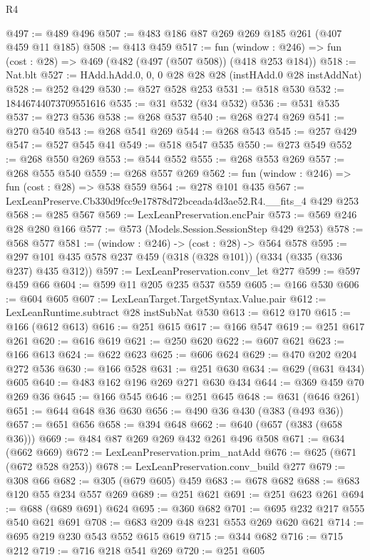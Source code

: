 \begin{lexlean}{R4}
\begin{coremodule}
@497 := @489 @496
@507 := @483 @186 @87 @269 @269 @185 @261 (@407 @459 @11 @185)
@508 := @413 @459
@517 := fun (window : @246) => fun (cost : @28) => @469 (@482 (@497 (@507 @508)) (@418 @253 @184))
@518 := Nat.blt
@527 := HAdd.hAdd.{0, 0, 0} @28 @28 @28 (instHAdd.{0} @28 instAddNat)
@528 := @252 @429
@530 := @527 @528 @253
@531 := @518 @530
@532 := 18446744073709551616
@535 := @31 @532 (@34 @532)
@536 := @531 @535
@537 := @273 @536
@538 := @268 @537
@540 := @268 @274 @269
@541 := @270 @540
@543 := @268 @541 @269
@544 := @268 @543
@545 := @257 @429
@547 := @527 @545 @41
@549 := @518 @547 @535
@550 := @273 @549
@552 := @268 @550 @269
@553 := @544 @552
@555 := @268 @553 @269
@557 := @268 @555 @540
@559 := @268 @557 @269
@562 := fun (window : @246) => fun (cost : @28) => @538 @559
@564 := @278 @101 @435
@567 := LexLeanPreserve.Cb330d9fcc9e17878d72bceada4d3ae52.R4.__fits_4 @429 @253
@568 := @285 @567
@569 := LexLeanPreservation.encPair
@573 := @569 @246 @28 @280 @166
@577 := @573 (Models.Session.SessionStep @429 @253)
@578 := @568 @577
@581 := (window : @246) -> (cost : @28) -> @564 @578
@595 := @297 @101 @435 @578 @237 @459 (@318 (@328 @101)) (@334 (@335 (@336 @237) @435 @312))
@597 := LexLeanPreservation.conv_let @277
@599 := @597 @459 @66
@604 := @599 @11 @205 @235 @537 @559
@605 := @166 @530
@606 := @604 @605
@607 := LexLeanTarget.TargetSyntax.Value.pair
@612 := LexLeanRuntime.subtract @28 instSubNat @530
@613 := @612 @170
@615 := @166 (@612 @613)
@616 := @251 @615
@617 := @166 @547
@619 := @251 @617 @261
@620 := @616 @619
@621 := @250 @620
@622 := @607 @621
@623 := @166 @613
@624 := @622 @623
@625 := @606 @624
@629 := @470 @202 @204 @272 @536
@630 := @166 @528
@631 := @251 @630
@634 := @629 (@631 @434) @605
@640 := @483 @162 @196 @269 @271 @630 @434
@644 := @369 @459 @70 @269 @36
@645 := @166 @545
@646 := @251 @645
@648 := @631 (@646 @261)
@651 := @644 @648 @36 @630
@656 := @490 @36 @430 (@383 (@493 @36))
@657 := @651 @656
@658 := @394 @648
@662 := @640 (@657 (@383 (@658 @36)))
@669 := @484 @87 @269 @269 @432 @261 @496 @508
@671 := @634 (@662 @669)
@672 := LexLeanPreservation.prim_natAdd
@676 := @625 (@671 (@672 @528 @253))
@678 := LexLeanPreservation.conv_build @277
@679 := @308 @66
@682 := @305 (@679 @605) @459
@683 := @678 @682
@688 := @683 @120 @55 @234 @557 @269
@689 := @251 @621
@691 := @251 @623 @261
@694 := @688 (@689 @691) @624
@695 := @360 @682
@701 := @695 @232 @217 @555 @540 @621 @691
@708 := @683 @209 @48 @231 @553 @269 @620 @621
@714 := @695 @219 @230 @543 @552 @615 @619
@715 := @344 @682
@716 := @715 @212
@719 := @716 @218 @541 @269
@720 := @251 @605

\end{coremodule}
\end{lexlean}
